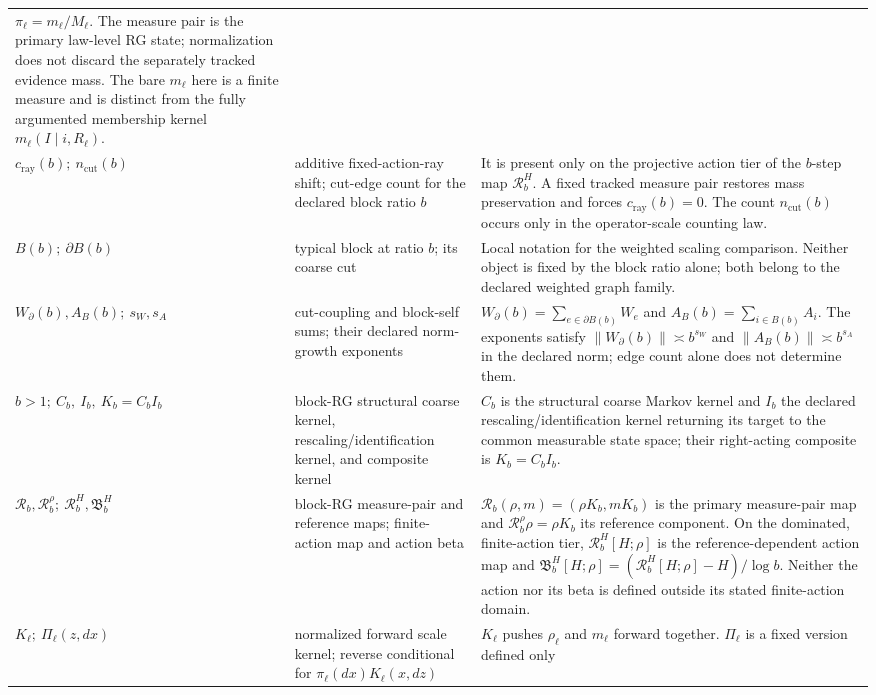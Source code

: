 \begin{longtable}{@{}>{\raggedright\arraybackslash}p{}
>{\raggedright\arraybackslash}p{}
>{\raggedright\arraybackslash}p{}@{}}
\(\pi_\ell=m_\ell/M_\ell\).  The measure pair is the primary law-level RG
state; normalization does not discard the separately tracked evidence mass.
The bare \(m_\ell\) here is a finite measure and is distinct from the fully
argumented membership kernel \(m_\ell(I\mid i,R_\ell)\). \\
\(c_{\mathrm{ray}}(b);\ n_{\mathrm{cut}}(b)\) &
additive fixed-action-ray shift; cut-edge count for the declared block ratio \(b\) &
It is present only on the projective action tier of the \(b\)-step map
\(\mathcal R_b^H\). A fixed tracked measure pair restores mass preservation
and forces \(c_{\mathrm{ray}}(b)=0\). The count
\(n_{\mathrm{cut}}(b)\) occurs only in the operator-scale counting law. \\
\(B(b);\ \partial B(b)\) &
typical block at ratio \(b\); its coarse cut &
Local notation for the weighted scaling comparison. Neither object is fixed by
the block ratio alone; both belong to the declared weighted graph family. \\
\(W_{\partial}(b),A_B(b);\ s_W,s_A\) &
cut-coupling and block-self sums; their declared norm-growth exponents &
\(W_{\partial}(b)=\sum_{e\in\partial B(b)}W_e\) and
\(A_B(b)=\sum_{i\in B(b)}A_i\). The exponents satisfy
\(\lVert W_{\partial}(b)\rVert\asymp b^{s_W}\) and
\(\lVert A_B(b)\rVert\asymp b^{s_A}\) in the declared norm; edge count alone
does not determine them. \\
\(b>1;\ C_b,\ I_b,\ K_b=C_bI_b\) &
block-RG structural coarse kernel, rescaling/identification kernel, and
composite kernel &
\(C_b\) is the structural coarse Markov kernel and \(I_b\) the declared
rescaling/identification kernel returning its target to the common measurable
state space; their right-acting composite is \(K_b=C_bI_b\). \\
\(\mathcal R_b,\mathcal R_b^\rho;\ \mathcal R_b^H,\mathfrak B_b^H\) &
block-RG measure-pair and reference maps; finite-action map and action beta &
\(\mathcal R_b(\rho,m)=(\rho K_b,mK_b)\) is the primary measure-pair map and
\(\mathcal R_b^\rho\rho=\rho K_b\) its reference component. On the dominated,
finite-action tier, \(\mathcal R_b^H[H;\rho]\) is the reference-dependent
action map and \(\mathfrak B_b^H[H;\rho]=(\mathcal R_b^H[H;\rho]-H)/\log b\).
Neither the action nor its beta is defined outside its stated finite-action
domain. \\
\(K_\ell;\ \Pi_\ell(z,dx)\) &
normalized forward scale kernel; reverse conditional for
\(\pi_\ell(dx)K_\ell(x,dz)\) &
\(K_\ell\) pushes \(\rho_\ell\) and \(m_\ell\) forward together.
\(\Pi_\ell\) is a fixed version defined only

\end{longtable}
